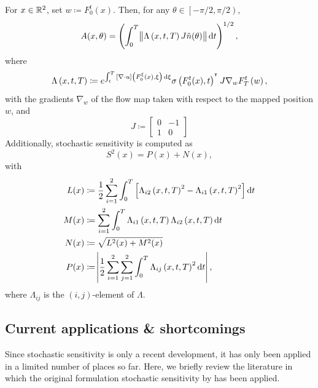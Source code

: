 \begin{theorem}\label{thm:orig_s2_calculation}
	For \(x \in \mathbb{R}^2\), set \(w \coloneqq F_0^t(x)\).
	Then, for any \(\theta \in \left[-\pi/2, \pi/2\right)\),
	\[
		A(x,\theta) = \left(\int_0^T{\norm{\Lambda\left(x, t, T\right)J\hat{n}(\theta)}\dif t}\right)^{1/2},
	\]
	where
	\[
		\Lambda\left(x,t,T\right) \coloneqq e^{\int_t^T{\left[\nabla \cdot u\right]\left(F_0^\xi(x), \xi\right)\dif\xi}}\sigma\left(F_0^t(x), t\right)^{\T}J \nabla_w F_T^t\left(w\right),
	\]
	with the gradients \(\nabla_w\) of the flow map taken with respect to the mapped position \(w\), and
	\[
		J \coloneqq \begin{bmatrix}
			0 & -1 \\
			1 & 0
		\end{bmatrix}
	\]
	Additionally, stochastic sensitivity is computed as
	\[
		S^2(x) = P(x) + N(x),
	\]
	with
	\begin{align*}
		L(x) & \coloneqq \frac12\sum_{i=1}^2\int_0^T\left[\Lambda_{i2}\left(x,t, T\right)^2 - \Lambda_{i1}\left(x,t,T\right)^2\right]\dif t \\
		M(x) & \coloneqq \sum_{i=1}^2\int_0^T{\Lambda_{i1}\left(x,t,T\right)\Lambda_{i2}\left(x,t,T\right)\dif t}                           \\
		N(x) & \coloneqq \sqrt{L^2(x) + M^2(x)}                                                                                             \\
		P(x) & \coloneqq \abs{\frac12\sum_{i=1}^2\sum_{j=1}^2{\int_0^T{\Lambda_{ij}\left(x,t,T\right)^2\dif t}}},
	\end{align*}
	where \(\Lambda_{ij}\) is the \((i,j)\)-element of \(\Lambda\).
\end{theorem}




\subsection{Current applications \& shortcomings}
Since stochastic sensitivity is only a recent development, it has only been applied in a limited number of places so far.
Here, we briefly review the literature in which the original formulation stochastic sensitivity by \citet{Balasuriya_2020_StochasticSensitivityComputable} has been applied.

